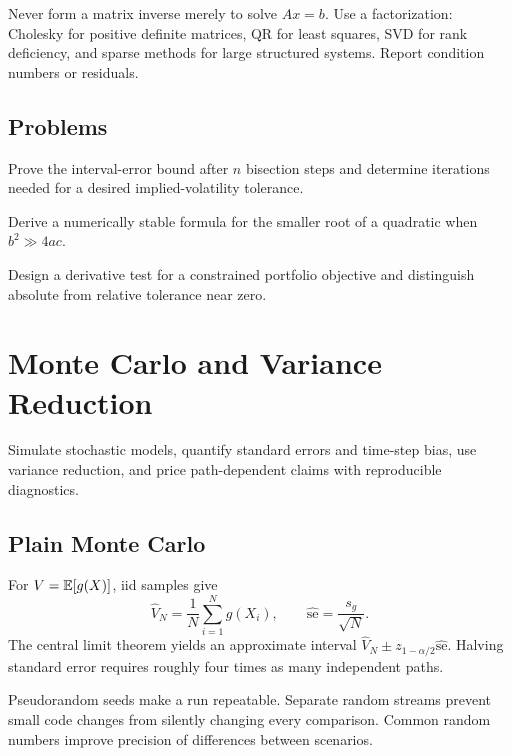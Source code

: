 Never form a matrix inverse merely to solve $Ax=b$. Use a factorization: Cholesky
for positive definite matrices, QR for least squares, SVD for rank deficiency, and
sparse methods for large structured systems. Report condition numbers or residuals.

\section{Problems}

\begin{exercise}
Prove the interval-error bound after $n$ bisection steps and determine iterations
needed for a desired implied-volatility tolerance.
\end{exercise}
\begin{exercise}
Derive a numerically stable formula for the smaller root of a quadratic when
$b^2\gg4ac$.
\end{exercise}
\begin{exercise}
Design a derivative test for a constrained portfolio objective and distinguish
absolute from relative tolerance near zero.
\end{exercise}


\chapter{Monte Carlo and Variance Reduction}

\begin{objectives}
Simulate stochastic models, quantify standard errors and time-step bias, use variance
reduction, and price path-dependent claims with reproducible diagnostics.
\end{objectives}

\section{Plain Monte Carlo}

For $V=\operatorname{\mathbb E}[g(X)]$, iid samples give
\[
\widehat V_N=\frac1N\sum_{i=1}^Ng(X_i),\qquad
\widehat{\mathrm{se}}=
\frac{s_g}{\sqrt N}.
\]
The central limit theorem yields an approximate interval
$\widehat V_N\pm z_{1-\alpha/2}\widehat{\mathrm{se}}$. Halving standard error
requires roughly four times as many independent paths.

Pseudorandom seeds make a run repeatable. Separate random streams prevent small code
changes from silently changing every comparison. Common random numbers improve
precision of differences between scenarios.

